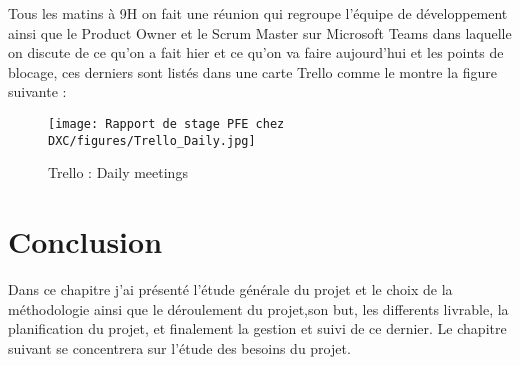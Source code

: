 Tous les matins à 9H on fait une réunion qui regroupe l'équipe de développement ainsi que le Product Owner et le Scrum Master sur Microsoft Teams dans laquelle on discute de ce qu’on a fait hier et ce qu’on va faire aujourd’hui et les points de blocage, ces derniers sont listés dans une carte Trello comme le montre la figure suivante :

\begin{figure}[H]
    \centering
    \texttt{[image: Rapport de stage PFE chez DXC/figures/Trello\_Daily.jpg]}
    \caption{Trello : Daily meetings}
\end{figure}




\section{Conclusion}

Dans ce chapitre j’ai présenté l’étude générale du projet et le choix de la méthodologie ainsi
que le déroulement du projet,son but, les differents livrable, la planification du projet, et finalement la gestion et suivi de ce dernier. Le chapitre suivant se concentrera sur l’étude des besoins du projet.
